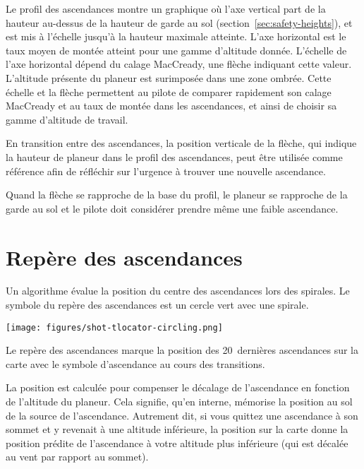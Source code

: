 Le profil des ascendances montre un graphique où l'axe vertical part de la hauteur au-dessus de la hauteur de garde au sol (section~\ref{sec:safety-heights}), et est mis à l'échelle jusqu'à la hauteur maximale atteinte.
L'axe horizontal est le taux moyen de montée atteint pour une gamme d'altitude donnée.
L'échelle de l'axe horizontal dépend du calage MacCready, une flèche indiquant cette valeur.
L'altitude présente du planeur est surimposée dans une zone ombrée.
Cette échelle et la flèche permettent au pilote de comparer rapidement son calage MacCready et au taux de montée dans les ascendances, et ainsi de choisir sa gamme d'altitude de travail.


En transition entre des ascendances, la position verticale de la flèche, qui indique la hauteur de planeur dans le profil des ascendances, peut être utilisée comme référence afin de réfléchir sur l'urgence à trouver une nouvelle ascendance.

Quand la flèche se rapproche de la base du profil, le planeur se rapproche de la garde au sol et le pilote doit considérer prendre même une faible ascendance.

\section{Repère des ascendances}
Un algorithme évalue la position du centre des ascendances lors des spirales.
Le symbole du repère des ascendances est un cercle vert avec une spirale.

\begin{center}
\texttt{[image: figures/shot-tlocator-circling.png]}
\end{center}

Le repère des ascendances marque la position des 20~dernières ascendances sur la carte avec le symbole d'ascendance au cours des transitions.

La position est calculée pour compenser le décalage de l'ascendance en fonction de l'altitude du planeur.
Cela signifie, qu'en interne, \xc{} mémorise la position au sol de la source de l'ascendance.
Autrement dit, si vous quittez une ascendance à son sommet et y revenait à une altitude inférieure, la position sur la carte donne la position prédite de l'ascendance à votre altitude plus inférieure (qui est décalée au vent par rapport au sommet).

